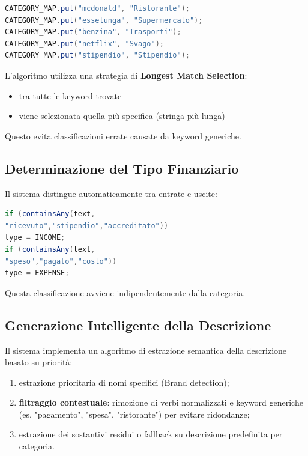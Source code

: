 \medskip

\begin{lstlisting}[language=Java]
CATEGORY_MAP.put("mcdonald", "Ristorante");
CATEGORY_MAP.put("esselunga", "Supermercato");
CATEGORY_MAP.put("benzina", "Trasporti");
CATEGORY_MAP.put("netflix", "Svago");
CATEGORY_MAP.put("stipendio", "Stipendio");
\end{lstlisting}

L'algoritmo utilizza una strategia di \textbf{Longest Match Selection}:

\begin{itemize}
    \item tra tutte le keyword trovate
    \item viene selezionata quella più specifica (stringa più lunga)
\end{itemize}

Questo evita classificazioni errate causate da keyword generiche.

\subsection{Determinazione del Tipo Finanziario}

Il sistema distingue automaticamente tra entrate e uscite:

\medskip

\begin{lstlisting}[language=Java]
if (containsAny(text,
"ricevuto","stipendio","accreditato"))
type = INCOME;
if (containsAny(text,
"speso","pagato","costo"))
type = EXPENSE;
\end{lstlisting}

Questa classificazione avviene indipendentemente dalla categoria.

\subsection{Generazione Intelligente della Descrizione}

Il sistema implementa un algoritmo di estrazione semantica della descrizione basato su priorità:

\begin{enumerate}
    \item estrazione prioritaria di nomi specifici (Brand detection);
    \item \textbf{filtraggio contestuale}: rimozione di verbi normalizzati e keyword generiche (es. "pagamento", "spesa", "ristorante") per evitare ridondanze;
    \item estrazione dei sostantivi residui o fallback su descrizione predefinita per categoria.
\end{enumerate}

